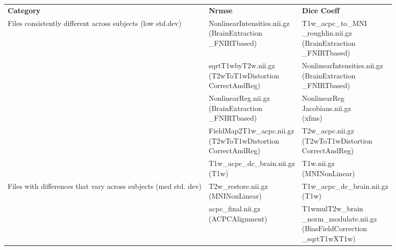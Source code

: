 \begin{center}
\begin{longtable}{|p{}|p{}|p{}|}
\cline{1-3}
\textbf{Category} & \textbf{Nrmse} & \textbf{Dice Coeff} \\\cline{1-3}
\multirow{5}{.2\textwidth}{Files consistently different across subjects (low std.dev)}     & \makecell[l]{NonlinearIntensities.nii.gz \\ (BrainExtraction\\\_FNIRTbased)}  & \makecell[l]{T1w\_acpc\_to\_MNI\\\_roughlin.nii.gz \\ (BrainExtraction\\\_FNIRTbased)} \\\cline{2-3}
& \makecell[l]{sqrtT1wbyT2w.nii.gz \\(T2wToT1wDistortion\\CorrectAndReg)}                   & \makecell[l]{NonlinearIntensities.nii.gz\\(BrainExtraction\\\_FNIRTbased)} \\\cline{2-3}
& \makecell[l]{NonlinearReg.nii.gz\\(BrainExtraction\\\_FNIRTbased)}                        & \makecell[l]{NonlinearReg\\Jacobians.nii.gz\\(xfms)} \\\cline{2-3}
& \makecell[l]{FieldMap2T1w\_acpc.nii.gz\\(T2wToT1wDistortion\\CorrectAndReg)}              & \makecell[l]{T2w\_acpc.nii.gz\\(T2wToT1wDistortion\\CorrectAndReg)} \\\cline{2-3}
& \makecell[l]{T1w\_acpc\_dc\_brain.nii.gz\\(T1w)}                                        & \makecell[l]{T1w.nii.gz\\(MNINonLinear)} \\\cline{1-3}
\multirow{5}{.2\textwidth}{Files with differences that vary across subjects (med std. dev)} & \makecell[l]{T2w\_restore.nii.gz\\(MNINonLinear)}  & \makecell[l]{T1w\_acpc\_dc\_brain.nii.gz\\(T1w)} \\\cline{2-3}
& \makecell[l]{acpc\_final.nii.gz \\(ACPCAlignment)}                       & \makecell[l]{T1wmulT2w\_brain \\ \_norm\_modulate.nii.gz\\(BiasFieldCorrection\\\_sqrtT1wXT1w)} \\\cline{2-3}

\end{longtable}
\end{center}
